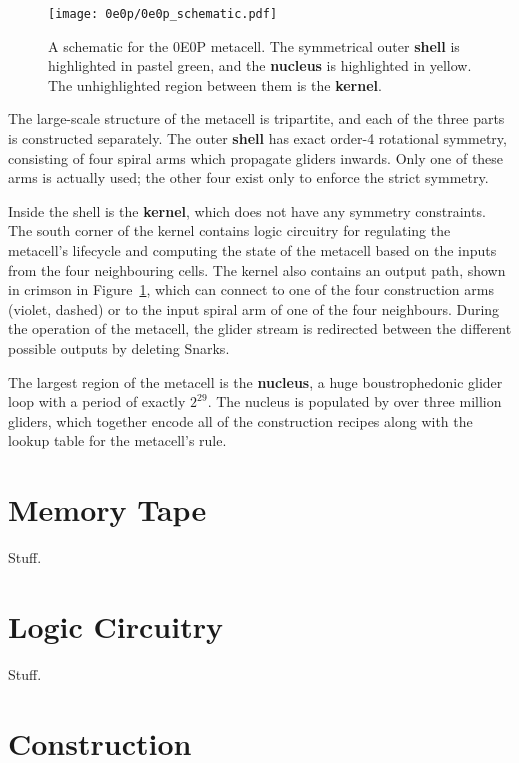 \begin{figure}[htb]
    \centering
    \texttt{[image: 0e0p/0e0p\_schematic.pdf]}
    \caption{A schematic for the 0E0P metacell. The symmetrical outer
    \textbf{shell} is highlighted in pastel green, and the \textbf{nucleus}
    is highlighted in yellow. The unhighlighted region between them is the
    \textbf{kernel}.}\label{fig:0e0p_schematic}
\end{figure}

The large-scale structure of the metacell is tripartite, and each of the
three parts is constructed separately. The outer \textbf{shell} has exact
order-4 rotational symmetry, consisting of four spiral arms which propagate
gliders inwards. Only one of these arms is actually used; the other four
exist only to enforce the strict symmetry.

Inside the shell is the \textbf{kernel}, which does not have any symmetry
constraints. The south corner of the kernel contains logic circuitry for
regulating the metacell's lifecycle and computing the state of the metacell
based on the inputs from the four neighbouring cells. The kernel also contains
an output path, shown in crimson in Figure~\ref{fig:0e0p_schematic}, which
can connect to one of the four construction arms (violet, dashed) or to the
input spiral arm of one of the four neighbours. During the operation of the
metacell, the glider stream is redirected between the different possible
outputs by deleting Snarks.

The largest region of the metacell is the \textbf{nucleus}, a huge
boustrophedonic glider loop with a period of exactly $2^{29}$. The nucleus
is populated by over three million gliders, which together encode all of
the construction recipes along with the lookup table for the metacell's rule.

\section{Memory Tape}

Stuff.

\section{Logic Circuitry}

Stuff.

\section{Construction}

